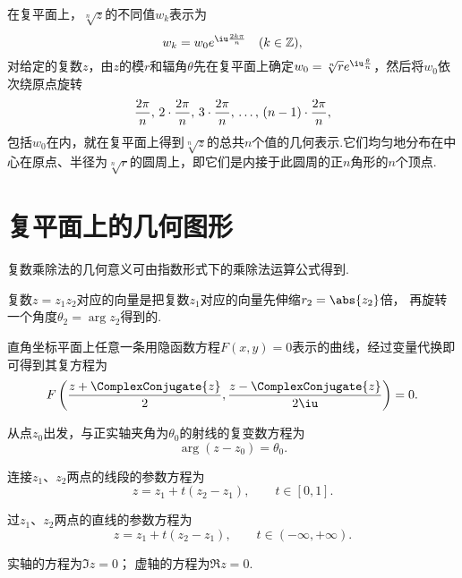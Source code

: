 在复平面上，\(\sqrt[n]{z}\)的不同值\(w_k\)表示为\begin{equation*}
w_k = w_0 e^{\iu\frac{2k\pi}{n}} \quad (k \in \mathbb{Z}),
\end{equation*}对给定的复数\(z\)，由\(z\)的模\(r\)和辐角\(\theta\)先在复平面上确定\(w_0 = \sqrt[n]{r} e^{\iu\frac{\theta}{n}}\)，然后将\(w_0\)依次绕原点旋转\begin{equation*}
\def\f{\frac{2\pi}{n}}
\f,\,2\cdot\f,\,3\cdot\f,\,\dots,\,(n-1)\cdot\f,
\end{equation*}包括\(w_0\)在内，就在复平面上得到\(\sqrt[n]{z}\)的总共\(n\)个值的几何表示.它们均匀地分布在中心在原点、半径为\(\sqrt[n]{r}\)的圆周上，即它们是内接于此圆周的正\(n\)角形的\(n\)个顶点.

\section{复平面上的几何图形}
复数乘除法的几何意义可由指数形式下的乘除法运算公式得到.

复数\(z=z_1 z_2\)对应的向量是把复数\(z_1\)对应的向量先伸缩\(r_2 = \abs{z_2}\)倍，
再旋转一个角度\(\theta_2 = \arg z_2\)得到的.

直角坐标平面上任意一条用隐函数方程\(F(x,y)=0\)表示的曲线，经过变量代换即可得到其复方程为\begin{equation*}
F\left(\frac{z+\ComplexConjugate{z}}{2},\frac{z-\ComplexConjugate{z}}{2\iu}\right)=0.
\end{equation*}

\begin{example}[射线]
从点\(z_0\)出发，与正实轴夹角为\(\theta_0\)的射线的复变数方程为\begin{equation*}
\arg(z-z_0) = \theta_0.
\end{equation*}
\end{example}

\begin{example}[线段]
连接\(z_1\)、\(z_2\)两点的线段的参数方程为\begin{equation*}
z = z_1 + t(z_2 - z_1), \qquad t \in [0,1].
\end{equation*}
\end{example}

\begin{example}[直线]
过\(z_1\)、\(z_2\)两点的直线的参数方程为\begin{equation*}
z = z_1 + t(z_2 - z_1), \qquad t \in (-\infty,+\infty).
\end{equation*}

实轴的方程为\(\Im z = 0\)；
虚轴的方程为\(\Re z = 0\).
\end{example}

